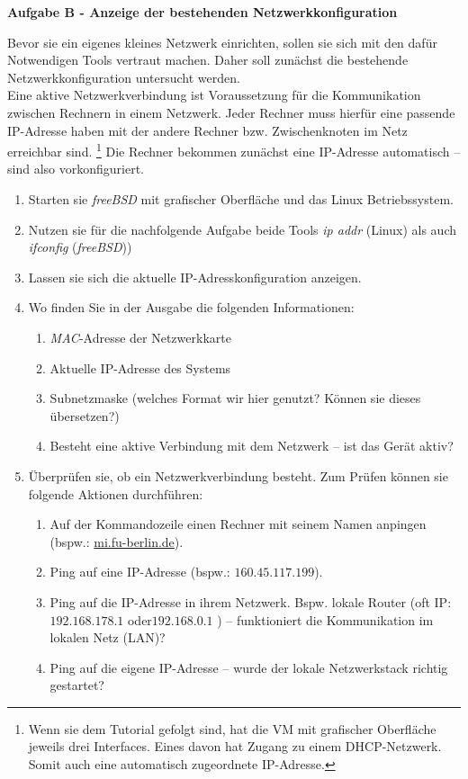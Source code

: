 \documentclass[paper=a4,fontsize=11pt]{scrartcl}%
\begin{document}
\begin{center}
\Large{\textbf{Aufgabe B - Anzeige der bestehenden Netzwerkkonfiguration}}
\end{center}
Bevor sie ein eigenes kleines Netzwerk einrichten, sollen sie sich mit den dafür Notwendigen Tools vertraut machen. Daher soll zunächst die bestehende Netzwerkkonfiguration untersucht werden.\\
Eine aktive Netzwerkverbindung ist Voraussetzung für die Kommunikation zwischen Rechnern in einem Netzwerk. Jeder Rechner muss hierfür eine passende IP-Adresse haben mit der andere Rechner bzw. Zwischenknoten im Netz erreichbar sind. \footnote{Wenn sie dem Tutorial gefolgt sind, hat die VM mit grafischer Oberfläche jeweils drei Interfaces. Eines davon hat Zugang zu einem DHCP-Netzwerk. Somit auch eine automatisch zugeordnete IP-Adresse.} Die Rechner bekommen zunächst eine IP-Adresse automatisch -- sind also vorkonfiguriert.\\
\begin{enumerate}
	\item Starten sie \emph{freeBSD} mit grafischer Oberfläche und das Linux Betriebssystem.
	\item Nutzen sie für die nachfolgende Aufgabe beide Tools \emph{ip addr} (Linux) als auch \emph{ifconfig} (\emph{freeBSD}))
	\item Lassen sie sich die aktuelle IP-Adresskonfiguration anzeigen.
	\item Wo finden Sie in der Ausgabe die folgenden Informationen:
	\begin{enumerate}
		\item \emph{MAC}-Adresse der Netzwerkkarte
		\item Aktuelle IP-Adresse des Systems
		\item Subnetzmaske (welches Format wir hier genutzt? Können sie dieses übersetzen?)
		\item Besteht eine aktive Verbindung mit dem Netzwerk -- ist das Gerät aktiv?
	\end{enumerate}
	\item Überprüfen sie, ob ein Netzwerkverbindung besteht. Zum Prüfen können sie folgende Aktionen durchführen:
	\begin{enumerate}
		\item Auf der Kommandozeile einen Rechner mit seinem Namen anpingen (bspw.: \url{mi.fu-berlin.de}).
		\item Ping auf eine IP-Adresse (bspw.: $160.45.117.199$).
		\item Ping auf die IP-Adresse in ihrem Netzwerk. Bspw. lokale Router (oft IP: $192.168.178.1$ oder$192.168.0.1$ ) -- funktioniert die Kommunikation im lokalen Netz (LAN)?
		\item Ping auf die eigene IP-Adresse -- wurde der lokale Netzwerkstack richtig gestartet?
	\end{enumerate}
\end{enumerate}
\end{document}
